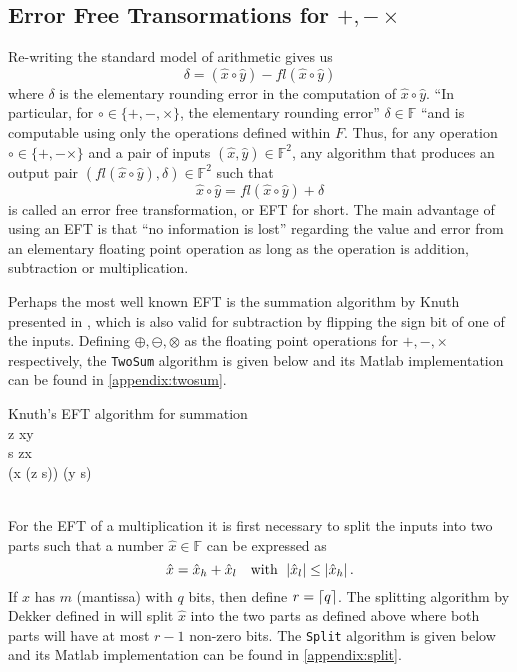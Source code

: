 \documentclass{standalone}
\begin{document}
	\subsection{Error Free Transormations for $+,-\times$}
	Re-writing the standard model of arithmetic gives us$$\delta=(\hat{x}\circ\hat{y})-fl(\hat{x}\circ\hat{y})$$where $\delta$ is the elementary rounding error in the computation of $\hat{x}\circ\hat{y}$. ``In particular, for $\circ\in\{+,-,\times\}$, the elementary rounding error'' $\delta\in\mathbb{F}$ ``and is computable using only the operations defined within $F$. \cite{langlois2005solving} Thus, for any operation $\circ\in\{+,-\times\}$ and a pair of inputs $(\hat{x},\hat{y})\in\mathbb{F}^{2}$, any algorithm that produces an output pair $(fl(\hat{x}\circ\hat{y}),\delta)\in\mathbb{F}^{2}$ such that$$\hat{x}\circ\hat{y}=fl(\hat{x}\circ\hat{y})+\delta$$is called an error free transformation, or EFT for short. \cite{langlois2005solving} \cite{ogita2005accurate} The main advantage of using an EFT is that ``no information is lost'' regarding the value and error from an elementary floating point operation as long as the operation is addition, subtraction or multiplication.
	\par
	Perhaps the most well known EFT is the summation algorithm by Knuth presented in \cite{knuth1998art}, which is also valid for subtraction by flipping the sign bit of one of the inputs. Defining $\oplus,\ominus,\otimes$ as the floating point operations for $+,-,\times$ respectively, the \texttt{TwoSum} algorithm is given below and its Matlab implementation can be found in \ref{appendix:twosum}.
	\newline
	\begin{minipage}[t][2.0in][t]{6.5in}
	\begin{pseudocode}{Knuth's EFT algorithm for summation}{\:}
		\\
			z \GETS x\oplus y\\
			s \GETS z\ominus x\\
			\delta \GETS (x \ominus (z \ominus s)) \oplus (y \ominus s)\\
			\\
		\ENDPROCEDURE
	\end{pseudocode}
	\end{minipage}
	\par
	For the EFT of a multiplication it is first necessary to split the inputs into two parts such that a number $\hat{x}\in\mathbb{F}$ can be expressed as$$\hat{x}=\hat{x}_{h}+\hat{x}_{l}\quad\text{with}\:\:\abs{\hat{x}_{l}}\le\abs{\hat{x}_{h}}.$$If $\hat{x}$ has $m$ (mantissa) with $q$ bits, then define $r=\ceil*{q}$. The splitting algorithm by Dekker defined in \cite{dekker1971floating} will split $\hat{x}$ into the two parts as defined above where both parts will have at most $r-1$ non-zero bits. The \texttt{Split} algorithm is given below and its Matlab implementation can be found in \ref{appendix:split}.
\end{document}
